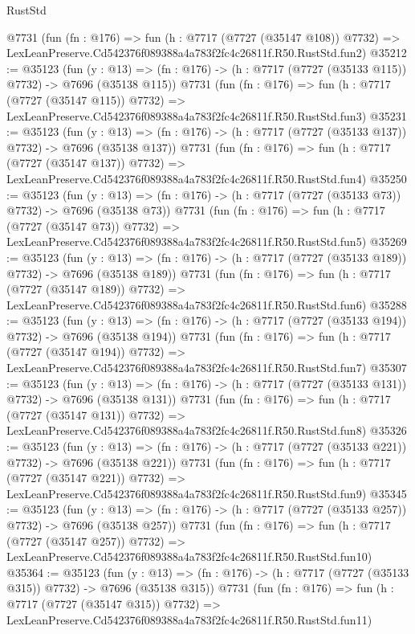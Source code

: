 \begin{lexlean}{RustStd}
\begin{coremodule}
    @7731
    (fun (fn : @176) =>
    fun (h : @7717 (@7727 (@35147 @108)) @7732) =>
    LexLeanPreserve.Cd542376f089388a4a783f2fc4c26811f.R50.RustStd.fun2)
@35212 := @35123
    (fun (y : @13) => (fn : @176) -> (h : @7717 (@7727 (@35133 @115)) @7732) -> @7696 (@35138 @115))
    @7731
    (fun (fn : @176) =>
    fun (h : @7717 (@7727 (@35147 @115)) @7732) =>
    LexLeanPreserve.Cd542376f089388a4a783f2fc4c26811f.R50.RustStd.fun3)
@35231 := @35123
    (fun (y : @13) => (fn : @176) -> (h : @7717 (@7727 (@35133 @137)) @7732) -> @7696 (@35138 @137))
    @7731
    (fun (fn : @176) =>
    fun (h : @7717 (@7727 (@35147 @137)) @7732) =>
    LexLeanPreserve.Cd542376f089388a4a783f2fc4c26811f.R50.RustStd.fun4)
@35250 := @35123
    (fun (y : @13) => (fn : @176) -> (h : @7717 (@7727 (@35133 @73)) @7732) -> @7696 (@35138 @73))
    @7731
    (fun (fn : @176) =>
    fun (h : @7717 (@7727 (@35147 @73)) @7732) =>
    LexLeanPreserve.Cd542376f089388a4a783f2fc4c26811f.R50.RustStd.fun5)
@35269 := @35123
    (fun (y : @13) => (fn : @176) -> (h : @7717 (@7727 (@35133 @189)) @7732) -> @7696 (@35138 @189))
    @7731
    (fun (fn : @176) =>
    fun (h : @7717 (@7727 (@35147 @189)) @7732) =>
    LexLeanPreserve.Cd542376f089388a4a783f2fc4c26811f.R50.RustStd.fun6)
@35288 := @35123
    (fun (y : @13) => (fn : @176) -> (h : @7717 (@7727 (@35133 @194)) @7732) -> @7696 (@35138 @194))
    @7731
    (fun (fn : @176) =>
    fun (h : @7717 (@7727 (@35147 @194)) @7732) =>
    LexLeanPreserve.Cd542376f089388a4a783f2fc4c26811f.R50.RustStd.fun7)
@35307 := @35123
    (fun (y : @13) => (fn : @176) -> (h : @7717 (@7727 (@35133 @131)) @7732) -> @7696 (@35138 @131))
    @7731
    (fun (fn : @176) =>
    fun (h : @7717 (@7727 (@35147 @131)) @7732) =>
    LexLeanPreserve.Cd542376f089388a4a783f2fc4c26811f.R50.RustStd.fun8)
@35326 := @35123
    (fun (y : @13) => (fn : @176) -> (h : @7717 (@7727 (@35133 @221)) @7732) -> @7696 (@35138 @221))
    @7731
    (fun (fn : @176) =>
    fun (h : @7717 (@7727 (@35147 @221)) @7732) =>
    LexLeanPreserve.Cd542376f089388a4a783f2fc4c26811f.R50.RustStd.fun9)
@35345 := @35123
    (fun (y : @13) => (fn : @176) -> (h : @7717 (@7727 (@35133 @257)) @7732) -> @7696 (@35138 @257))
    @7731
    (fun (fn : @176) =>
    fun (h : @7717 (@7727 (@35147 @257)) @7732) =>
    LexLeanPreserve.Cd542376f089388a4a783f2fc4c26811f.R50.RustStd.fun10)
@35364 := @35123
    (fun (y : @13) => (fn : @176) -> (h : @7717 (@7727 (@35133 @315)) @7732) -> @7696 (@35138 @315))
    @7731
    (fun (fn : @176) =>
    fun (h : @7717 (@7727 (@35147 @315)) @7732) =>
    LexLeanPreserve.Cd542376f089388a4a783f2fc4c26811f.R50.RustStd.fun11)

\end{coremodule}
\end{lexlean}
